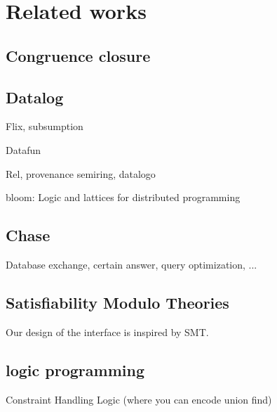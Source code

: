 \chapter{Related works}

\section{Congruence closure}

\section{Datalog}

Flix, subsumption

Datafun

Rel, provenance semiring, datalogo

bloom: Logic and lattices for distributed programming

\section{Chase}

Database exchange, certain answer, query optimization, ...

\section{Satisfiability Modulo Theories}

Our design of the interface is inspired by SMT.

\section{logic programming}

Constraint Handling Logic (where you can encode union find)
